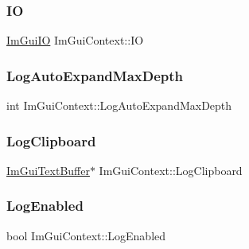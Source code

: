 \hypertarget{struct_im_gui_context_add4fdcc8c6a437d8f8e7c837418be83c}{}\label{struct_im_gui_context_add4fdcc8c6a437d8f8e7c837418be83c} 
\subsubsection{\texorpdfstring{IO}{IO}}
{\footnotesize\ttfamily \hyperlink{struct_im_gui_i_o}{Im\+Gui\+IO} Im\+Gui\+Context\+::\+IO}

\hypertarget{struct_im_gui_context_a153d8c6eee2acdd3676ca55aec7b1079}{}\label{struct_im_gui_context_a153d8c6eee2acdd3676ca55aec7b1079} 
\subsubsection{\texorpdfstring{Log\+Auto\+Expand\+Max\+Depth}{LogAutoExpandMaxDepth}}
{\footnotesize\ttfamily int Im\+Gui\+Context\+::\+Log\+Auto\+Expand\+Max\+Depth}

\hypertarget{struct_im_gui_context_a676007461d3ce20e50a092573dc05064}{}\label{struct_im_gui_context_a676007461d3ce20e50a092573dc05064} 
\subsubsection{\texorpdfstring{Log\+Clipboard}{LogClipboard}}
{\footnotesize\ttfamily \hyperlink{struct_im_gui_text_buffer}{Im\+Gui\+Text\+Buffer}$\ast$ Im\+Gui\+Context\+::\+Log\+Clipboard}

\hypertarget{struct_im_gui_context_a2508bec1862aa4477eca2c79d6924b82}{}\label{struct_im_gui_context_a2508bec1862aa4477eca2c79d6924b82} 
\subsubsection{\texorpdfstring{Log\+Enabled}{LogEnabled}}
{\footnotesize\ttfamily bool Im\+Gui\+Context\+::\+Log\+Enabled}

\hypertarget{struct_im_gui_context_a73a73a599720fb933e4fb5e673dde131}{}\label{struct_im_gui_context_a73a73a599720fb933e4fb5e673dde131} 
